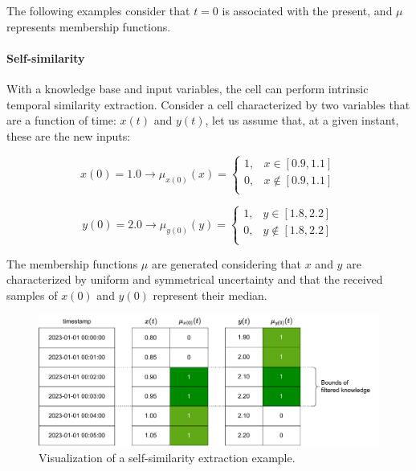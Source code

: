 The following examples consider that $t=0$ is associated with the present, and $\mu$ represents membership functions.

\paragraph{Self-similarity}

With a knowledge base and input variables, the cell can perform intrinsic temporal similarity extraction.
Consider a cell characterized by two variables that are a function of time: $x(t)$ and $y(t)$,
let us assume that, at a given instant, these are the new inputs:

\begin{equation}
    x(0) = 1.0 \rightarrow \mu_{x(0)}(x) =
    \begin{cases}
        1, & x \in [0.9, 1.1]    \\
        0, & x \notin [0.9, 1.1] \\
    \end{cases}
\end{equation}

\begin{equation}
    y(0) = 2.0 \rightarrow \mu_{y(0)}(y) =
    \begin{cases}
        1, & y \in [1.8, 2.2]    \\
        0, & y \notin [1.8, 2.2] \\
    \end{cases}
\end{equation}

The membership functions $\mu$ are generated considering that $x$ and $y$ are characterized by uniform and symmetrical uncertainty and that the received samples of $x(0)$ and $y(0)$ represent their median.

\begin{figure}[h!]
    \centering
    \includegraphics[width=\linewidth]{figures/chapter4/cell/solo_state_estimation.pdf}
    \caption{Visualization of a self-similarity extraction example.}
    \label{fig:solo_state_estimation}
\end{figure}


